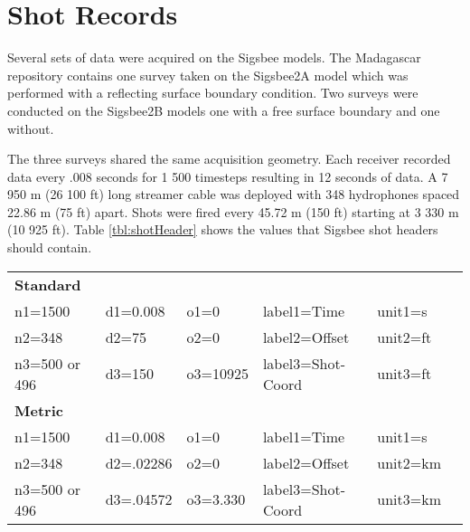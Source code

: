 
\section{Shot Records}
Several sets of data were acquired on the Sigsbee models.  The Madagascar repository contains one survey taken on the 
Sigsbee2A model which was performed with a reflecting surface boundary condition.  Two surveys were conducted on the Sigsbee2B  
models one with a free surface boundary and one without.  

The three surveys shared the same acquisition geometry.  Each receiver recorded data every .008 seconds for 1 500 timesteps resulting 
in 12 seconds of data.  A 7 950 m (26 100 ft) long streamer cable was deployed with 348 hydrophones spaced 22.86 m (75 ft) apart.  Shots were fired
every 45.72 m (150 ft) starting at 3 330 m  (10 925 ft).  Table \ref{tbl:shotHeader} shows the values that Sigsbee shot headers should contain.  

{
\begin{tabular}[t]{|llllll|}
        \hline 
	\textbf{Standard}    &  &           &                       &              &  \\
        n1=1500  &   d1=0.008	&  o1=0     &    label1=Time        &   unit1=s    &  \\
	n2=348	 &   d2=75 	&  o2=0     &    label2=Offset      &   unit2=ft   &  \\
	n3=500 or 496   &   d3=150     &  o3=10925 &    label3=Shot-Coord  &   unit3=ft   &  \\
	\textbf{Metric}      &  &           &                       &              &  \\
        n1=1500  &   d1=0.008	&  o1=0     &    label1=Time        &   unit1=s    &  \\
	n2=348	 &   d2=.02286 	&  o2=0     &    label2=Offset      &   unit2=km   &  \\
	n3=500 or 496   &   d3=.04572     &  o3=3.330 &    label3=Shot-Coord  &   unit3=km   &  \\
        \hline
\end{tabular}
}

